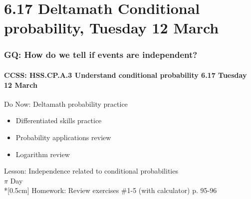\documentclass{beamer}
\begin{document}
\section{6.17 Deltamath Conditional probability, Tuesday 12 March}
  \frame
  {
    \frametitle{GQ: How do we tell if events are independent?}
    \framesubtitle{CCSS: HSS.CP.A.3 Understand conditional probability \hfill \alert{6.17 Tuesday 12 March}}
      \begin{block}{Do Now: Deltamath probability practice}
        \begin{itemize}
          \item Differentiated skills practice
          \item Probability applications review
          \item Logarithm review
        \end{itemize}
      \end{block}
    Lesson: Independence related to conditional probabilities\\
    \alert{$\pi$ Day}\\*[0.5cm]
    Homework: Review exercises \#1-5 (with calculator) p. 95-96
  }
\end{document}
